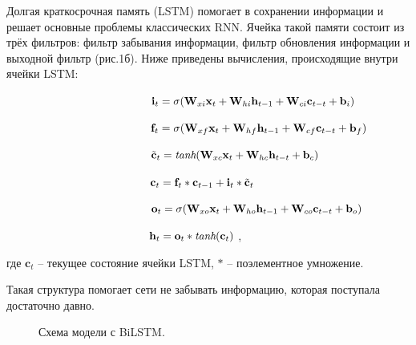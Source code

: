\documentclass[12pt, a4paper]{article} %
\begin{document}
Долгая краткосрочная память (LSTM) \cite{Hochreiter1997} помогает в сохранении информации и решает основные проблемы классических RNN. Ячейка такой памяти состоит из трёх фильтров: фильтр забывания информации, фильтр обновления информации и выходной фильтр (рис.1б).
Ниже приведены вычисления, происходящие внутри ячейки LSTM:
\begin{flushleft}


$\hspace{45mm}\mathbf{i}_t=\mathbf{\sigma}(\mathbf{W}_{xi}\mathbf{x}_{t}+\mathbf{W}_{hi}\mathbf{h}_{t-1} + \mathbf{W}_{ci}\mathbf{c}_{t-t} + \mathbf{b}_{i})$

$\hspace{45mm}\mathbf{f}_t=\mathbf{\sigma}(\mathbf{W}_{xf}\mathbf{x}_{t}+\mathbf{W}_{hf}\mathbf{h}_{t-1} + \mathbf{W}_{cf}\mathbf{c}_{t-t} + \mathbf{b}_{f})$

$\hspace{45mm}\tilde{\mathbf{c}}_t = \textit{tanh}(\mathbf{W}_{xc}\mathbf{x}_{t} + \mathbf{W}_{hc}\mathbf{h}_{t-t} + \mathbf{b}_{c})$

$\hspace{45mm}\mathbf{c}_t = \mathbf{f}_t\ast\mathbf{c}_{t-1}+\mathbf{i}_t\ast\tilde{\mathbf{c}}_t$

$\hspace{45mm}\mathbf{o}_t=\mathbf{\sigma}(\mathbf{W}_{xo}\mathbf{x}_{t}+\mathbf{W}_{ho}\mathbf{h}_{t-1} + \mathbf{W}_{co}\mathbf{c}_{t-t} + \mathbf{b}_{o})$

$\hspace{45mm}\mathbf{h}_t = \mathbf{o}_t\ast\textit{tanh}(\mathbf{c}_t)$,

\end{flushleft}
где $\mathbf{c}_t$ -- текущее состояние ячейки LSTM, $\ast$ -- поэлементное умножение.

Такая структура помогает сети не забывать информацию, которая поступала достаточно давно.

\begin{figure}[h]
	\caption{Схема модели с BiLSTM.}
	\label{ris:image3}
\end{figure}
\end{document}
